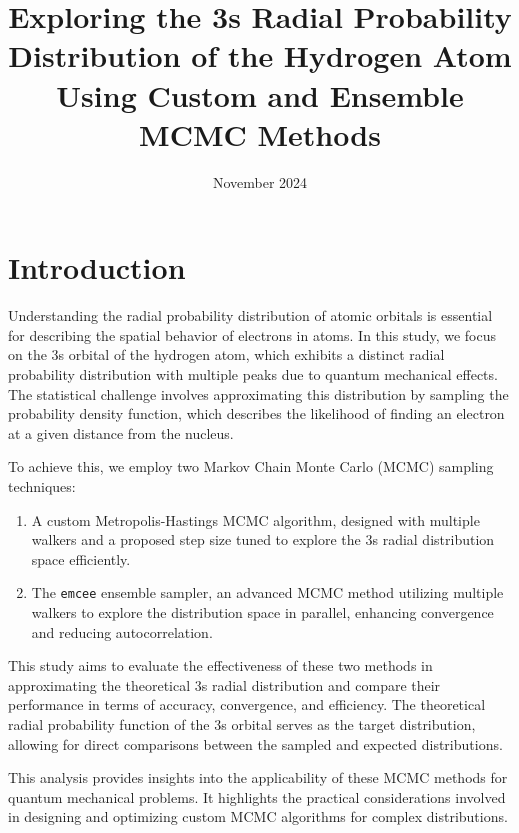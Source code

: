 \documentclass[twocolumn, 11pt]{article}
\title{Exploring the 3s Radial Probability Distribution of the Hydrogen Atom Using Custom and Ensemble MCMC Methods}
\date{November 2024}
\makeatletter
\renewcommand{\maketitle}{\bgroup
  \centering
  {\LARGE \bfseries \color{darkpurple} \@title \par}
  \vskip 1em
  {\large \color{darkpurple} \@author \par}
  \vskip 1em
  {\footnotesize \@date \color{darkpurple}\par}
  \egroup
}
\makeatother
\begin{document}
\twocolumn[
\begin{@twocolumnfalse}
    \maketitle
    \vspace{10pt}
\end{@twocolumnfalse}
]

\section*{Introduction}
Understanding the radial probability distribution of atomic orbitals is essential for describing the spatial behavior of electrons in atoms. In this study, we focus on the 3s orbital of the hydrogen atom, which exhibits a distinct radial probability distribution with multiple peaks due to quantum mechanical effects. The statistical challenge involves approximating this distribution by sampling the probability density function, which describes the likelihood of finding an electron at a given distance from the nucleus.

To achieve this, we employ two Markov Chain Monte Carlo (MCMC) sampling techniques:
\begin{enumerate}
    \item A custom Metropolis-Hastings MCMC algorithm, designed with multiple walkers and a proposed step size tuned to explore the 3s radial distribution space efficiently.
    \item The \texttt{emcee} ensemble sampler, an advanced MCMC method utilizing multiple walkers to explore the distribution space in parallel, enhancing convergence and reducing autocorrelation.
\end{enumerate}

This study aims to evaluate the effectiveness of these two methods in approximating the theoretical 3s radial distribution and compare their performance in terms of accuracy, convergence, and efficiency. The theoretical radial probability function of the 3s orbital serves as the target distribution, allowing for direct comparisons between the sampled and expected distributions.

This analysis provides insights into the applicability of these MCMC methods for quantum mechanical problems. It highlights the practical considerations involved in designing and optimizing custom MCMC algorithms for complex distributions.
\end{document}
